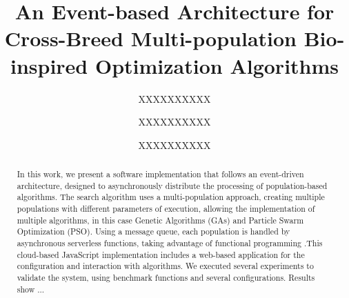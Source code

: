 \documentclass[runningheads]{llncs}
\begin{document}
%
\title{An Event-based Architecture for Cross-Breed Multi-population Bio-inspired Optimization Algorithms}
%
%
\author{XXXXXXXXXX \and
XXXXXXXXXX \and
XXXXXXXXXX}
%
%
%
\maketitle              %
%
\begin{abstract}
  In this work, we present a software implementation that follows an
  event-driven architecture, designed to asynchronously distribute the
  processing of population-based algorithms. The search algorithm uses a
  multi-population approach, creating multiple populations with different
  parameters of execution, allowing the implementation of multiple algorithms, in
  this case Genetic Algorithms (GAs) and Particle Swarm Optimization (PSO).
  Using a message queue, each population is handled by asynchronous
  serverless functions, taking advantage of functional programming
    .This cloud-based JavaScript implementation includes a web-based
    application for
    the configuration and interaction with algorithms. We executed
    several
    experiments to validate the system, using benchmark functions and
    several configurations. Results show ...




\end{abstract}
%
%
%
\end{document}
